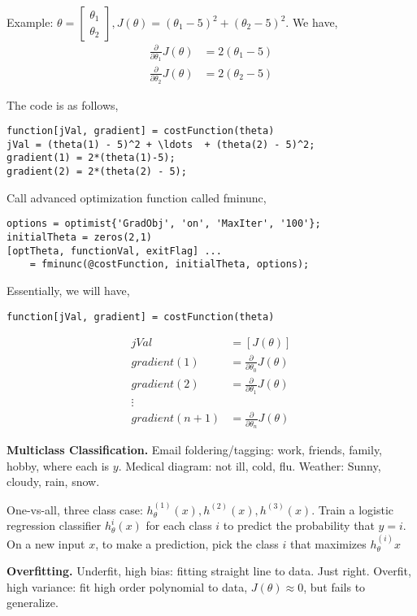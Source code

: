 \documentclass[a4 paper, 11 pt]{article}
\begin{document}
Example:
$\theta = \begin{bmatrix} \theta_1 \\ \theta_2\end{bmatrix}, J(\theta) = (\theta_1 - 5)^2 + (\theta_2 - 5)^2$. We have,
\begin{align*}
\frac{\partial}{\partial\theta_1}J(\theta) &= 2(\theta_1 - 5) \\
\frac{\partial}{\partial\theta_2}J(\theta) &= 2(\theta_2 - 5)
\end{align*}

The code is as follows,
\begin{lstlisting}
function[jVal, gradient] = costFunction(theta)
jVal = (theta(1) - 5)^2 + \ldots  + (theta(2) - 5)^2;
gradient(1) = 2*(theta(1)-5);
gradient(2) = 2*(theta(2) - 5);
\end{lstlisting}
Call advanced optimization function called fminunc,
\begin{lstlisting}
options = optimist{'GradObj', 'on', 'MaxIter', '100'};
initialTheta = zeros(2,1)
[optTheta, functionVal, exitFlag] ...
	= fminunc(@costFunction, initialTheta, options);
\end{lstlisting}

Essentially, we will have,
\begin{lstlisting}
function[jVal, gradient] = costFunction(theta)
\end{lstlisting}
\begin{align*}
jVal &= [J(\theta)] \\
gradient(1) &= \frac{\partial}{\partial\theta_0}J(\theta) \\
gradient(2) &= \frac{\partial}{\partial\theta_1}J(\theta) \\
\vdots & \\
gradient(n+1) &= \frac{\partial}{\partial\theta_n}J(\theta)
\end{align*}

\textbf{Multiclass Classification.} Email foldering/tagging: work, friends, family, hobby, where each is $y$. Medical diagram: not ill, cold, flu. Weather: Sunny, cloudy, rain, snow.

One-vs-all, three class case: $h_\theta^{(1)}(x), h^{(2)}(x), h^{(3)}(x)$. Train a logistic regression classifier $h_\theta^{i}(x)$ for each class $i$ to predict the probability that $y=i$. On a new input $x$, to make a prediction, pick the class $i$ that maximizes $h_\theta^{(i)}x$

\newpage
\textbf{Overfitting.} Underfit, high bias: fitting straight line to data. Just right. Overfit, high variance: fit high order polynomial to data, $J(\theta) \approx 0$, but fails to generalize.\\
\end{document}

